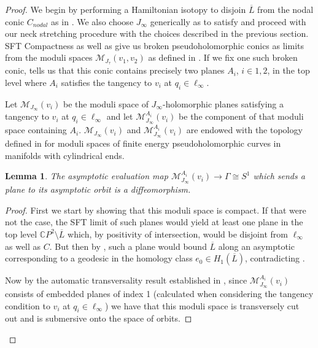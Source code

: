 \documentclass[10pt]{amsart}
\theoremstyle{plain}
\newtheorem{lemma}[thm]{Lemma}
\theoremstyle{definition}
\numberwithin{equation}{section}
\newcommand{\C}{\mathbb{C}}
\newcommand{\sm}{\setminus}
\begin{document}
\begin{proof}
We begin by performing a Hamiltonian isotopy to disjoin $\overline{L}$ from the nodal conic $C_{nodal}$ as in . We also choose $J_\infty$ generically as to satisfy  and proceed with our neck stretching procedure with the choices described in the previous section. SFT Compactness \cite{Bourgeois03_SFT} as well as  give us broken pseudoholomorphic conics as limits from the moduli spaces $\mathcal{M}_{J_\tau}(v_1,v_2)$ as defined in . If we fix one such broken conic,  tells us that this conic contains precisely two planes $A_i$, $i\in{1,2}$, in the top level where $A_i$ satisfies the tangency to $v_i$ at $q_i\in \ell_\infty$.

Let $\mathcal{M}_{J_\infty}(v_i)$ be the moduli space of $J_\infty$-holomorphic planes satisfying a tangency to $v_i$ at $q_i\in \ell_\infty$ and let $\mathcal{M}_{J_\infty}^{A_i}(v_i)$ be the component of that moduli space containing $A_i$. $\mathcal{M}_{J_\infty}(v_i)$ and $\mathcal{M}_{J_\infty}^{A_i}(v_i)$ are endowed with the topology defined in \cite[Section 8.2]{Bourgeois03_SFT} for moduli spaces of finite energy pseudoholomorphic curves in manifolds with cylindrical ends.

\begin{lemma}\label{lem:asympevalmap}
    The asymptotic evaluation map $\mathcal{M}_{J_\infty}^{A_i}(v_i)\to \Gamma \cong S^1$ which sends a plane to its asymptotic orbit is a diffeomorphism.
\end{lemma}

\begin{proof}
    First we start by showing that this moduli space is compact. If that were not the case, the SFT limit of such planes would yield at least one plane in the top level $\C P^2 \sm \overline{L}$ which, by positivity of intersection, would be disjoint from $\ell_\infty$ as well as $C$. But then by , such a plane would bound $\overline{L}$ along an asymptotic corresponding to a geodesic in the homology class $e_0\in H_1(\overline{L})$, contradicting .

    Now by the automatic transversality result established in \cite[Theorem 1]{Wendl09_AutoTransversality}, since $\mathcal{M}_{J_\infty}^{A_i}(v_i)$ consists of embedded planes of index 1 (calculated when considering the tangency condition to $v_i$ at $q_i\in \ell_\infty$) we have that this moduli space is transversely cut out and is submersive onto the space of orbits.


\end{proof}
\end{proof}
\end{document}
